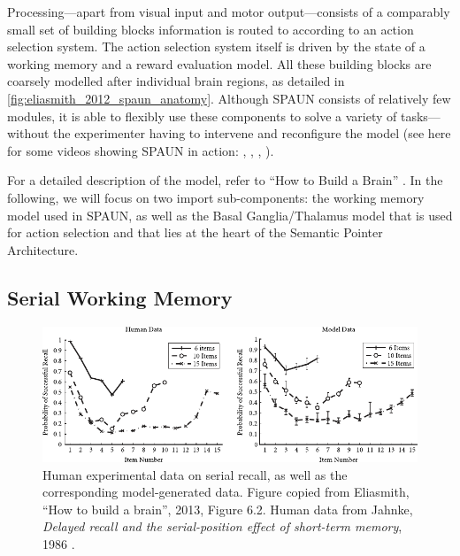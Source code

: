 \documentclass[10pt,letterpaper,oneside]{article}
\begin{document}
Processing---apart from visual input and motor output---consists of a comparably small set of building blocks information is routed to according to an action selection system. The action selection system itself is driven by the state of a working memory and a reward evaluation model. All these building blocks are coarsely modelled after individual brain regions, as detailed in \cref{fig:eliasmith_2012_spaun_anatomy}. Although SPAUN consists of relatively few modules, it is able to flexibly use these components to solve a variety of tasks---without the experimenter having to intervene and reconfigure the model (see here for some videos showing SPAUN in action: , , , ).

For a detailed description of the model, refer to \enquote{How to Build a Brain} \cite{eliasmith2013how}. In the following, we will focus on two import sub-components: the working memory model used in SPAUN, as well as the Basal Ganglia/Thalamus model that is used for action selection and that lies at the heart of the Semantic Pointer Architecture.

\subsection{Serial Working Memory}

\begin{figure}[t]
	\centering
	\includegraphics[scale=1.2]{media/htbab_ose_experiment.pdf}
	\caption{Human experimental data on serial recall, as well as the corresponding model-generated data. Figure copied from Eliasmith, \enquote{How to build a brain}, 2013, Figure 6.2. Human data from Jahnke, \emph{Delayed recall and the serial-position effect of short-term memory}, 1986 \cite{jahnke1968delayed}.}
	\label{fig:htbab_ose_experiment}
\end{figure}
\end{document}
